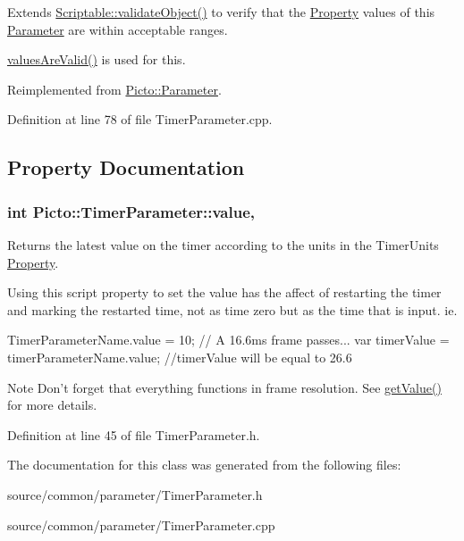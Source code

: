 Extends \hyperlink{class_picto_1_1_scriptable_ab6e2944c43a3b5d418bf7b251594386d}{Scriptable\-::validate\-Object()} to verify that the \hyperlink{class_picto_1_1_property}{Property} values of this \hyperlink{class_picto_1_1_parameter}{Parameter} are within acceptable ranges. 

\hyperlink{class_picto_1_1_parameter_a3443808da4c3edf26f2c3c3772d95b10}{values\-Are\-Valid()} is used for this. 

Reimplemented from \hyperlink{class_picto_1_1_parameter_a94c0e4191ffcc0bd642b647d24557082}{Picto\-::\-Parameter}.



Definition at line 78 of file Timer\-Parameter.\-cpp.



\subsection{Property Documentation}
\hypertarget{class_picto_1_1_timer_parameter_a2742cc0d9e28ee54c8159add6e58c3b6}{
\subsubsection[{value}]{\setlength{\rightskip}{0pt plus 5cm}int Picto\-::\-Timer\-Parameter\-::value\hspace{0.3cm}{\ttfamily [read]}, {\ttfamily [write]}}}\label{class_picto_1_1_timer_parameter_a2742cc0d9e28ee54c8159add6e58c3b6}


Returns the latest value on the timer according to the units in the Timer\-Units \hyperlink{class_picto_1_1_property}{Property}. 

Using this script property to set the value has the affect of restarting the timer and marking the restarted time, not as time zero but as the time that is input. ie.
\begin{DoxyCode}
TimerParameterName.value = 10;
\textcolor{comment}{// A 16.6ms frame passes...}
var timerValue = timerParameterName.value;
\textcolor{comment}{//timerValue will be equal to 26.6}
\end{DoxyCode}
 \begin{DoxyNote}{Note}
Don't forget that everything functions in frame resolution. See \hyperlink{class_picto_1_1_timer_parameter_a9a6e24c716f84e5d5b89ccee753d8a5f}{get\-Value()} for more details. 
\end{DoxyNote}


Definition at line 45 of file Timer\-Parameter.\-h.



The documentation for this class was generated from the following files\-:\begin{DoxyCompactItemize}
\item 
source/common/parameter/Timer\-Parameter.\-h\item 
source/common/parameter/Timer\-Parameter.\-cpp\end{DoxyCompactItemize}
